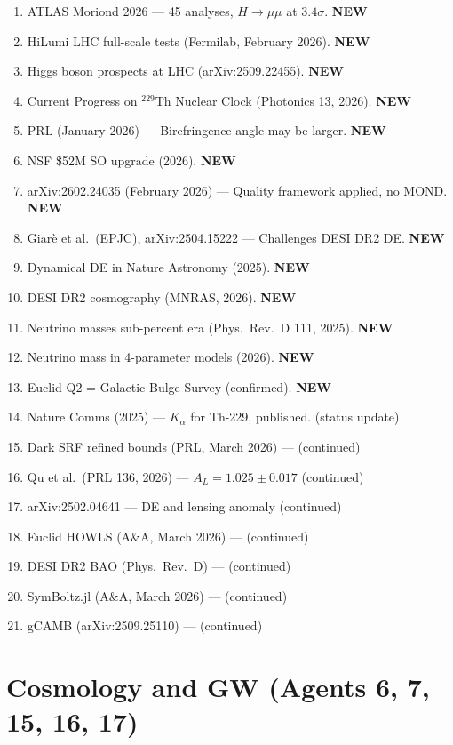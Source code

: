 \documentclass[11pt,a4paper]{article}
\newcommand{\NEW}{\textcolor{dfdblue}{\textbf{NEW}}}
\begin{document}
\begin{enumerate}
\item ATLAS Moriond 2026 --- 45 analyses, $H \to \mu\mu$ at $3.4\sigma$. \NEW
\item HiLumi LHC full-scale tests (Fermilab, February 2026). \NEW
\item Higgs boson prospects at LHC (arXiv:2509.22455). \NEW
\item Current Progress on $^{229}$Th Nuclear Clock (Photonics 13, 2026). \NEW
\item PRL (January 2026) --- Birefringence angle may be larger. \NEW
\item NSF \$52M SO upgrade (2026). \NEW
\item arXiv:2602.24035 (February 2026) --- Quality framework applied, no MOND. \NEW
\item Giar\`e et al.\ (EPJC), arXiv:2504.15222 --- Challenges DESI DR2 DE. \NEW
\item Dynamical DE in Nature Astronomy (2025). \NEW
\item DESI DR2 cosmography (MNRAS, 2026). \NEW
\item Neutrino masses sub-percent era (Phys.\ Rev.\ D 111, 2025). \NEW
\item Neutrino mass in 4-parameter models (2026). \NEW
\item Euclid Q2 = Galactic Bulge Survey (confirmed). \NEW
\item Nature Comms (2025) --- $K_\alpha$ for Th-229, published. (status update)
\item Dark SRF refined bounds (PRL, March 2026) --- (continued)
\item Qu et al.\ (PRL 136, 2026) --- $A_L = 1.025 \pm 0.017$ (continued)
\item arXiv:2502.04641 --- DE and lensing anomaly (continued)
\item Euclid HOWLS (A\&A, March 2026) --- (continued)
\item DESI DR2 BAO (Phys.\ Rev.\ D) --- (continued)
\item SymBoltz.jl (A\&A, March 2026) --- (continued)
\item gCAMB (arXiv:2509.25110) --- (continued)
\end{enumerate}

\section{Cosmology and GW (Agents 6, 7, 15, 16, 17)}
\end{document}
